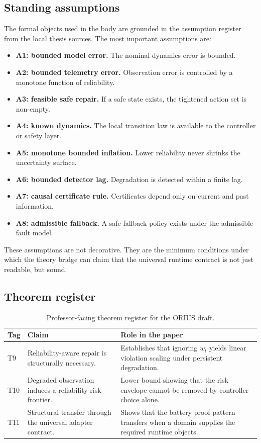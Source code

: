 \subsection{Standing assumptions}
The formal objects used in the body are grounded in the assumption register from the
local thesis sources.  The most important assumptions are:
\begin{itemize}
  \item \textbf{A1: bounded model error.} The nominal dynamics error is bounded.
  \item \textbf{A2: bounded telemetry error.} Observation error is controlled by a
  monotone function of reliability.
  \item \textbf{A3: feasible safe repair.} If a safe state exists, the tightened action
  set is non-empty.
  \item \textbf{A4: known dynamics.} The local transition law is available to the
  controller or safety layer.
  \item \textbf{A5: monotone bounded inflation.} Lower reliability never shrinks the
  uncertainty surface.
  \item \textbf{A6: bounded detector lag.} Degradation is detected within a finite lag.
  \item \textbf{A7: causal certificate rule.} Certificates depend only on current and
  past information.
  \item \textbf{A8: admissible fallback.} A safe fallback policy exists under the
  admissible fault model.
\end{itemize}
These assumptions are not decorative.  They are the minimum conditions under which the
theory bridge can claim that the universal runtime contract is not just readable, but
sound.

\subsection{Theorem register}
\begin{table}[t]
\centering
\caption{Professor-facing theorem register for the ORIUS draft.}
\label{tab:prof-theorem-register}
\begin{tabular}{p{}p{}p{}}
\toprule
\textbf{Tag} & \textbf{Claim} & \textbf{Role in the paper} \\
\midrule
T9 & Reliability-aware repair is structurally necessary. & Establishes that ignoring \(w_t\) yields linear violation scaling under persistent degradation. \\
T10 & Degraded observation induces a reliability-risk frontier. & Lower bound showing that the risk envelope cannot be removed by controller choice alone. \\
T11 & Structural transfer through the universal adapter contract. & Shows that the battery proof pattern transfers when a domain supplies the required runtime objects. \\
\bottomrule
\end{tabular}
\end{table}

